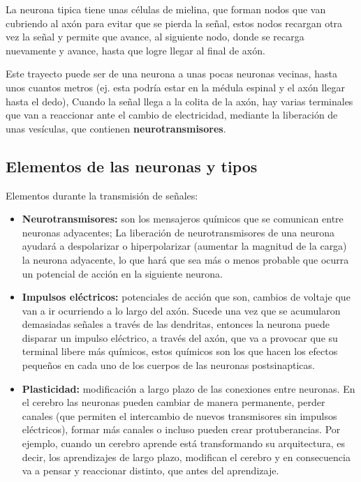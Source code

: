 La neurona tipica tiene unas células de mielina, que forman nodos que van cubriendo al axón para evitar que se pierda la señal, estos nodos recargan otra vez la señal y permite que avance, al siguiente nodo, donde se recarga  nuevamente y avance, hasta que logre llegar al final de axón.

Este trayecto puede ser de una neurona a unas pocas neuronas vecinas, hasta unos cuantos metros (ej. esta podría estar en la médula espinal y el axón llegar hasta el dedo), Cuando la señal llega a la colita de la axón, hay varias terminales que van a reaccionar ante el cambio de electricidad, mediante la liberación de unas vesículas, que contienen \textbf{neurotransmisores}.


\subsection{Elementos de las neuronas y tipos}

Elementos durante la transmisión de señales:

\begin{itemize}
\item \textbf{Neurotransmisores:} son los mensajeros químicos que se comunican entre neuronas adyacentes; La liberación de neurotransmisores de una neurona ayudará a despolarizar o hiperpolarizar (aumentar la magnitud de la carga) la neurona adyacente, lo que hará que sea más o menos probable que ocurra un potencial de acción en la siguiente neurona.
  
\item \textbf{Impulsos eléctricos:} potenciales de acción que son, cambios de voltaje que van a ir ocurriendo a lo largo del axón. Sucede una vez que se acumularon demasiadas señales a través de las dendritas, entonces la neurona puede disparar un impulso eléctrico, a través del axón, que va a provocar que su terminal libere más químicos, estos químicos son los que hacen los efectos pequeños en cada uno de los cuerpos de las neuronas postsinapticas.
 
\item \textbf{Plasticidad:} modificación a largo plazo de las conexiones entre neuronas. En el cerebro las neuronas pueden cambiar de manera permanente, perder canales (que permiten el intercambio de nuevos transmisores sin impulsos eléctricos), formar más canales o incluso pueden crear protuberancias. Por ejemplo, cuando un cerebro aprende está transformando su arquitectura, es decir, los aprendizajes de largo plazo, modifican el cerebro y en consecuencia va a pensar y reaccionar distinto, que antes del aprendizaje.
\end{itemize}

